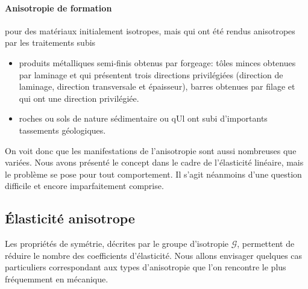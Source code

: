 \paragraph{Anisotropie de formation} pour des matériaux initialement isotropes, mais qui ont été rendus anisotropes par les traitements subis
\begin{itemize}
    \item produits métalliques semi-finis obtenus par forgeage: tôles minces obtenues par laminage et qui présentent trois directions privilégiées (direction de laminage, direction transversale et épaisseur), barres obtenues par filage et qui ont une direction privilégiée.
    \item roches ou sols de nature sédimentaire ou qUl ont subi d'importants 
tassements géologiques.
\end{itemize}

On voit donc que les manifestations de l'anisotropie sont aussi nombreuses que variées.
Nous avons présenté le concept dans le cadre de l'élasticité linéaire, mais le problème se pose pour tout comportement.
Il s'agit néanmoins d'une question difficile et encore imparfaitement comprise. 

\subsection{Élasticité anisotrope} 
Les propriétés de symétrie, décrites par le groupe d'isotropie $\mathcal{G}$, permettent de réduire le nombre des coefficients d'élasticité.
Nous allons envisager quelques cas particuliers correspondant aux types d'anisotropie que l'on rencontre le plus fréquemment en mécanique. 
